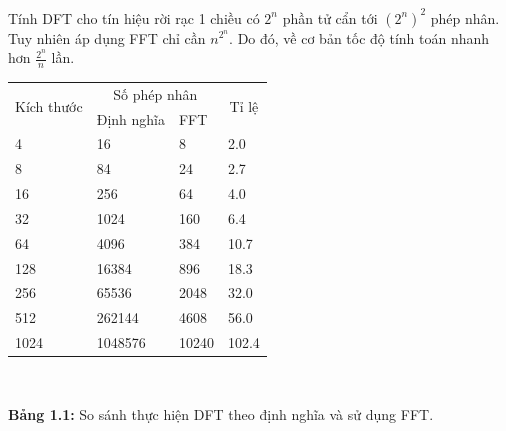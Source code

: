 \par Tính DFT cho tín hiệu rời rạc 1 chiều có $2^n$ phần tử cẩn tới $(2^n)^2$ phép nhân. Tuy nhiên áp dụng FFT chỉ cần $n^{2^n}$. Do đó, về cơ bản tốc độ tính toán nhanh hơn $\frac{2^n}{n}$ lần.\\
\begin{center}
\begin{tabular}{|l|l|l|l|}
\hline
\multicolumn{1}{|c|}{\multirow{2}{*}{Kích thước}} & \multicolumn{2}{c|}{Số phép nhân} & \multicolumn{1}{c|}{\multirow{2}{*}{Tỉ lệ}} \\ \cline{2-3}
\multicolumn{1}{|c|}{}                            & Định nghĩa         & FFT          & \multicolumn{1}{c|}{}                                          \\ \hline
4                                                 & 16                 & 8            & 2.0                                                            \\ \hline
8                                                 & 84                 & 24           & 2.7                                                            \\ \hline
16                                                & 256                & 64           & 4.0                                                            \\ \hline
32                                                & 1024               & 160          & 6.4                                                            \\ \hline
64                                                & 4096               & 384          & 10.7                                                           \\ \hline
128                                               & 16384              & 896          & 18.3                                                           \\ \hline
256                                               & 65536              & 2048         & 32.0                                                           \\ \hline
512                                               & 262144             & 4608         & 56.0                                                           \\ \hline
1024                                              & 1048576            & 10240        & 102.4                                                          \\ \hline
\end{tabular}
\\
\end{center}
\begin{center}
    \textbf{Bảng 1.1:} So sánh thực hiện DFT theo định nghĩa và sử dụng FFT.
\end{center}

